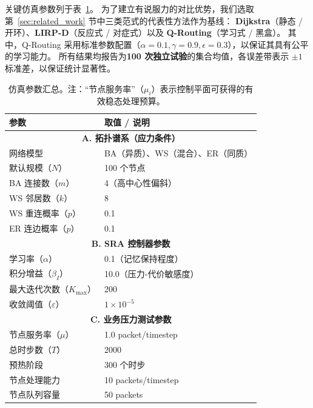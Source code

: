 \documentclass[journal]{IEEEtran}
\theoremstyle{plain}
\theoremstyle{definition}
\begin{document}
关键仿真参数列于表~\ref{tab:sim_params}。
为了建立有说服力的对比优势，我们选取第~\ref{sec:related_work} 节中三类范式的代表性方法作为基线：
\textbf{Dijkstra}（静态 / 开环）、\textbf{LIRP-D}（反应式 / 对症式）以及 \textbf{Q-Routing}（学习式 / 黑盒）。
其中，Q-Routing 采用标准参数配置（$\alpha=0.1, \gamma=0.9, \epsilon=0.3$），以保证其具有公平的学习能力。
所有结果均报告为\textbf{100 次独立试验}的集合均值，各误差带表示 $\pm1$ 标准差，以保证统计显著性。

\begin{table}[t!]
\centering
\caption{仿真参数汇总。注：``节点服务率''（$\mu_i$）表示控制平面可获得的有效稳态处理预算。}
\label{tab:sim_params}
\renewcommand{\arraystretch}{1.2}
\small
\begin{tabularx}{\columnwidth}{|l|X|}
\hline
\textbf{参数} & \textbf{取值 / 说明} \\
\hline
\hline
\multicolumn{2}{|c|}{\textbf{A. 拓扑谱系（应力条件）}} \\
\hline
网络模型 & BA（异质）、WS（混合）、ER（同质） \\
\hline
默认规模（$N$） & 100 个节点 \\
\hline
BA 连接数（$m$） & 4（高中心性偏斜） \\
\hline
WS 邻居数（$k$） & 8 \\
\hline
WS 重连概率（$p$） & 0.1 \\
\hline
ER 连边概率（$p$） & 0.1 \\
\hline
\hline
\multicolumn{2}{|c|}{\textbf{B. SRA 控制器参数}} \\
\hline
学习率（$\alpha$） & 0.1（记忆保持程度） \\
\hline
积分增益（$\beta_I$） & 10.0（压力-代价敏感度） \\
\hline
最大迭代次数（$K_{\max}$） & 200 \\
\hline
收敛阈值（$\varepsilon$） & $1 \times 10^{-5}$ \\
\hline
\hline
\multicolumn{2}{|c|}{\textbf{C. 业务压力测试参数}} \\
\hline
节点服务率（$\mu$） & 1.0 packet/timestep \\
\hline
总时步数（$T$） & 2000 \\
\hline
预热阶段 & 300 个时步 \\
\hline
节点处理能力 & 10 packets/timestep \\
\hline
节点队列容量 & 50 packets \\
\hline
\end{tabularx}
\end{table}
\end{document}
